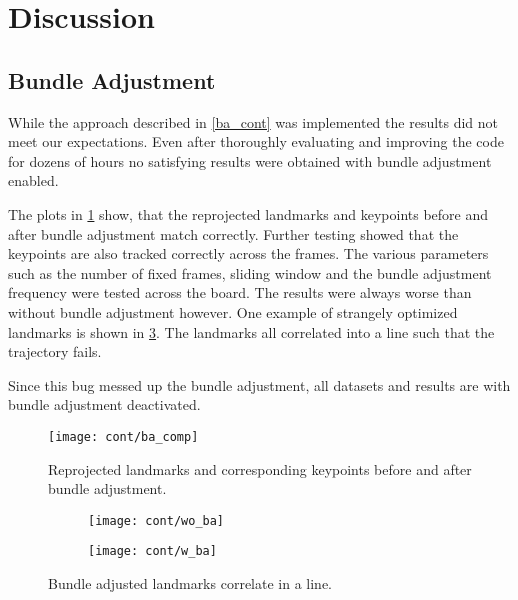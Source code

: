 \section{Discussion}

\subsection{Bundle Adjustment}
While the approach described in \cref{ba_cont} was implemented the results did not meet our expectations. Even after thoroughly evaluating and improving the code for dozens of hours no satisfying results were obtained with bundle adjustment enabled.

The plots in \cref{fig:ba_comp} show, that the reprojected landmarks and keypoints before and after bundle adjustment match correctly. Further testing showed that the keypoints are also tracked correctly across the frames. 
The various parameters such as the number of fixed frames, sliding window and the bundle adjustment frequency were tested across the board. The results were always worse than without bundle adjustment however.
One example of strangely optimized landmarks is shown in \cref{ba_vs_wo_ba}. The landmarks all correlated into a line such that the trajectory fails.

Since this bug messed up the bundle adjustment, all datasets and results are with bundle adjustment deactivated.

\begin{figure}[h!!]
	\centering
	\texttt{[image: cont/ba\_comp]}
	\caption{Reprojected landmarks and corresponding keypoints before and after bundle adjustment.}
	\label{fig:ba_comp}
\end{figure}

\begin{figure}[h!!]
\centering
   \begin{subfigure}[b]{0.55\textwidth}
   \texttt{[image: cont/wo\_ba]}
\end{subfigure}

\begin{subfigure}[b]{0.55\textwidth}
   \texttt{[image: cont/w\_ba]}
   \label{ba_vs_wo_ba}
\end{subfigure}
\caption{Bundle adjusted landmarks correlate in a line.}
\end{figure}

\newpage
